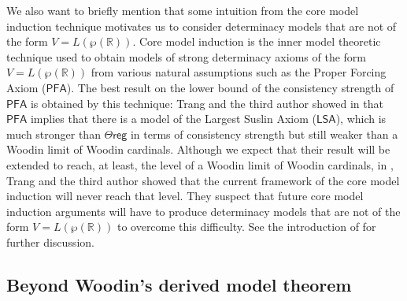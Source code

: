 \documentclass{amsart}
\newcommand{\power}{\wp}
\begin{document}
We also want to briefly mention that some intuition from the core model induction technique motivates us to consider determinacy models that are not of the form $V=L(\power(\mathbb{R}))$.
Core model induction is the inner model theoretic technique used to obtain models of strong determinacy axioms of the form $V=L(\power(\mathbb{R}))$ from various natural assumptions such as the Proper Forcing Axiom ($\mathsf{PFA}$).
The best result on the lower bound of the consistency strength of $\mathsf{PFA}$ is obtained by this technique:
Trang and the third author showed in \cite{LSAbook} that $\mathsf{PFA}$ implies that there is a model of the Largest Suslin Axiom ($\mathsf{LSA}$), which is much stronger than $\Theta\mathsf{reg}$ in terms of consistency strength but still weaker than a Woodin limit of Woodin cardinals.
Although we expect that their result will be extended to reach, at least, the level of a Woodin limit of Woodin cardinals, in \cite{SaTr}, Trang and the third author showed that the current framework of the core model induction will never reach that level.
They suspect that future core model induction arguments will have to produce determinacy models that are not of the form $V=L(\power(\mathbb{R}))$ to overcome this difficulty.
See the introduction of \cite{SaTr} for further discussion.

\subsection{Beyond Woodin's derived model theorem}
\end{document}
